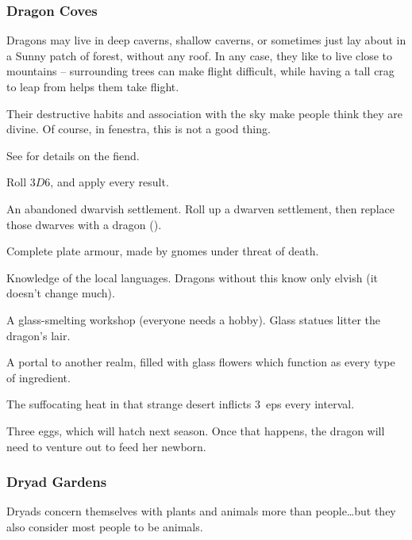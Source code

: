 \begin{multicols}{2}
\subsubsection{Dragon Coves}
\label{dragonPoint}

Dragons may live in deep caverns, shallow caverns, or sometimes just lay about in a Sunny patch of forest, without any roof.
In any case, they like to live close to mountains -- surrounding trees can make flight difficult, while having a tall crag to leap from helps them take flight.

Their destructive habits and association with the sky make people think they are divine.
Of course, in \gls{fenestra}, this is not a good thing.

See  for details on the fiend.

Roll $3D6$, and apply every result.

\begin{dlist}
  \item
  An abandoned dwarvish settlement.
  Roll up a dwarven settlement, then replace those dwarves with a dragon ().
  \item
  Complete plate armour, made by gnomes under threat of death.
  \iftoggle{core}{(See the core rules, \autopageref{bandingArmour}.)}{}
  \item
  Knowledge of the local languages.
  Dragons without this know only elvish (it doesn't change much).
  \item
  A glass-smelting workshop (everyone needs a hobby).
  Glass statues litter the dragon's lair.
  \item
  A portal to another realm, filled with glass flowers which function as every type of \gls{ingredient}.

  The suffocating heat in that strange desert inflicts 3~\glspl{ep} every \gls{interval}.
  \item
  Three eggs, which will hatch next season.
  Once that happens, the dragon will need to venture out to feed her newborn.
\end{dlist}

\subsubsection{Dryad Gardens}
\label{dryadPoint}

Dryads concern themselves with plants and animals more than people\ldots but they also consider most people to be animals.


\end{multicols}
